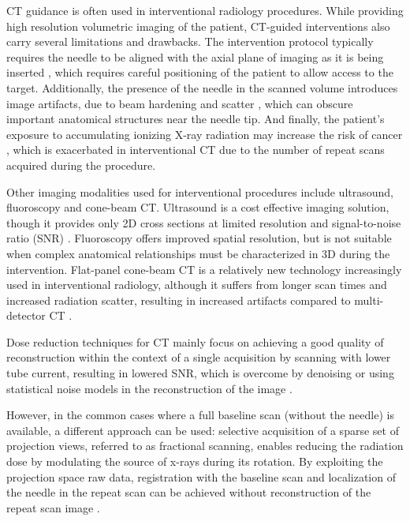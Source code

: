 \documentclass[letterpaper, 11 pt, conference]{ieeeconf} %
\begin{document}
CT guidance is often used in interventional radiology procedures.
While providing high resolution volumetric imaging of the patient, CT-guided interventions also carry several limitations and drawbacks.
The intervention protocol typically requires the needle to be aligned with the axial plane of imaging as it is being inserted \cite{gupta2014ct}, which requires careful positioning of the patient to allow access to the target.
Additionally, the presence of the needle in the scanned volume introduces image artifacts, due to beam hardening and scatter \cite{boas2012ctartifacts}, which can obscure important anatomical structures near the needle tip.
And finally, the patient's exposure to accumulating ionizing X-ray radiation may increase the risk of cancer \cite{mettler2000ct, chodick2007excess}, which is exacerbated in interventional CT due to the number of repeat scans acquired during the procedure.

Other imaging modalities used for interventional procedures include ultrasound, fluoroscopy and cone-beam CT.
Ultrasound is a cost effective imaging solution, though it provides only 2D cross sections at limited resolution and signal-to-noise ratio (SNR) \cite{sheafor2000comparison}.
Fluoroscopy offers improved spatial resolution, but is not suitable when complex anatomical relationships must be characterized in 3D during the intervention.
Flat-panel cone-beam CT is a relatively new technology increasingly used in interventional radiology, although it suffers from longer scan times and increased radiation scatter, resulting in increased artifacts compared to multi-detector CT \cite{orth2008cbct}.

Dose reduction techniques for CT mainly focus on achieving a good quality of reconstruction within the context of a single acquisition by scanning with lower tube current, resulting in lowered SNR, which is overcome by denoising \cite{manduca2009projection} or using statistical noise models in the reconstruction of the image \cite{zhang2016statistical,kim2015sparseview,niu2014sparse,liu2014total}. 

However, in the common cases where a full baseline scan (without the needle) is available, a different approach can be used:
selective acquisition of a sparse set of projection views, referred to as fractional scanning, enables reducing the radiation dose by modulating the source of x-rays during its rotation. By exploiting the projection space raw data, registration with the baseline scan and localization of the needle in the repeat scan can be achieved without reconstruction of the repeat scan image \cite{medan2017sparse, medan2017reduced}.
\end{document}
